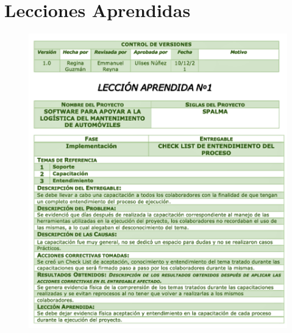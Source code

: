 \section{Lecciones Aprendidas}
\begin{figure}[!h]
	\centering
	\includegraphics[width=1\textwidth]{./lecciones/imagenes/leccionAprendida}
\end{figure}
\clearpage